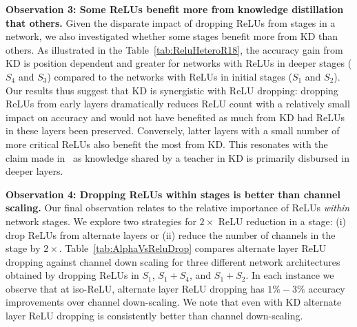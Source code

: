 {\bf Observation 3: Some ReLUs benefit more from knowledge distillation that others.}
Given the disparate impact of dropping ReLUs from stages in a network, 
we also investigated whether some stages benefit more from KD than others. 
As illustrated in the Table~\ref{tab:ReluHeteroR18}, 
the accuracy gain from KD is position dependent and greater for networks with ReLUs in deeper stages ($S_4$ and $S_3$) compared to the networks with ReLUs in initial stages ($S_1$ and $S_2$).
Our results thus suggest that KD is synergistic with ReLU dropping:
dropping ReLUs from early layers dramatically reduces ReLU count with a relatively small impact on accuracy and would not have benefited as much from KD had ReLUs in these layers been preserved.
Conversely, latter layers with a small number of more critical ReLUs also benefit the most from KD. 
This resonates with the claim made in~\cite{gotmare2018a}
as knowledge shared by a teacher in KD is primarily disbursed in deeper layers.
 





\textbf{Observation 4: Dropping ReLUs within stages is better than channel scaling.}
Our final observation relates to the relative importance of ReLUs \emph{within} network 
stages. 
We explore two strategies for $2\times$ ReLU reduction in a stage: 
(i) drop ReLUs from alternate layers or 
(ii) reduce the number of channels in the stage by $2\times$.
Table~\ref{tab:AlphaVsReluDrop} compares alternate layer ReLU dropping against channel down scaling for three different network architectures obtained by dropping ReLUs in $S_1$, $S_1+S_4$, and $S_1+S_2$.
In each instance we observe that at iso-ReLU, alternate layer ReLU dropping has $1\%-3\%$ accuracy improvements over channel down-scaling. 
We note that even with KD
alternate layer ReLU dropping is consistently better than channel down-scaling.